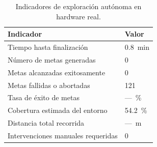 \begin{table}[H]
\centering
\caption{Indicadores de exploración autónoma en hardware real.}
\label{tab:explore_real}
\begin{tabular}{ll}
\hline
\textbf{Indicador} & \textbf{Valor} \\
\hline
Tiempo hasta finalización          & 0.8~min \\
Número de metas generadas          & 0 \\
Metas alcanzadas exitosamente      & 0 \\
Metas fallidas o abortadas         & 121 \\
Tasa de éxito de metas             & ---~\% \\
Cobertura estimada del entorno     & 54.2~\% \\
Distancia total recorrida          & ---~m \\
Intervenciones manuales requeridas & 0 \\
\hline
\end{tabular}
\end{table}

